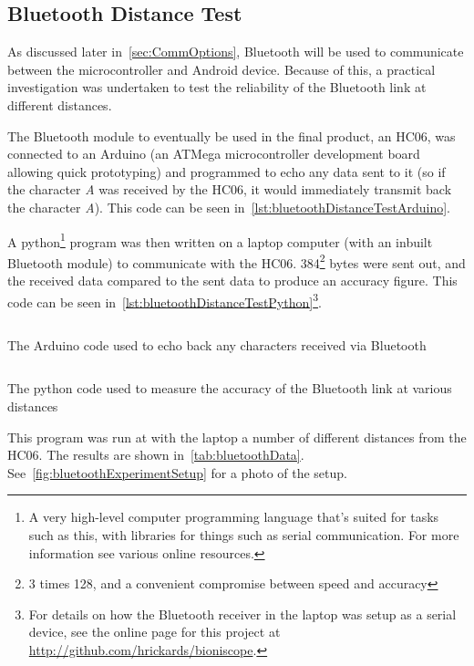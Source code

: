 \subsection{Bluetooth Distance Test}

As discussed later in~\cref{sec:CommOptions}, Bluetooth will be used to
communicate between the microcontroller and Android device. Because of this, a
practical investigation was undertaken to test the reliability of the Bluetooth
link at different distances.

The Bluetooth module to eventually be used in the final product, an HC06, was
connected to an Arduino (an ATMega microcontroller development board allowing
quick prototyping) and programmed to echo any data sent to it (so if the
character \textit{A} was received by the HC06, it would immediately transmit
back the character \textit{A}). This code can be seen
in~\cref{lst:bluetoothDistanceTestArduino}.

A python\footnote{A very high-level computer programming language that's suited
  for tasks such as this, with libraries for things such as serial
communication. For more information see various online resources.} program was
then written on a laptop computer (with an inbuilt Bluetooth module) to
communicate with the HC06. 384\footnote{3 times 128, and a convenient compromise
between speed and accuracy} bytes were sent out, and the received data compared
to the sent data to produce an accuracy figure. This code can be seen
in~\cref{lst:bluetoothDistanceTestPython}\footnote{For details on how the
  Bluetooth receiver in the laptop was setup as a serial device, see the online
page for this project at \url{http://github.com/hrickards/bioniscope}.}.

\begin{listing}
  \inputminted{c}{code/bluetooth.ino}
  \caption[Bluetooth experiment Arduino code]{The Arduino code used to echo back any characters received via
  Bluetooth}
  \label{lst:bluetoothDistanceTestArduino}
\end{listing}

\begin{listing}
  \inputminted{python}{code/bluetooth.py}
  \caption[Bluetooth experiment python code]{The python code used to measure the accuracy of the Bluetooth link at various distances}
  \label{lst:bluetoothDistanceTestPython}
\end{listing}

This program was run at with the laptop a number of different distances from the
HC06. The results are shown in~\cref{tab:bluetoothData}.
See~\cref{fig:bluetoothExperimentSetup} for a photo of the setup.

